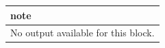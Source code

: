 \begin{tabular}{l}
\toprule
note \\
\midrule
No output available for this block. \\
\bottomrule
\end{tabular}
